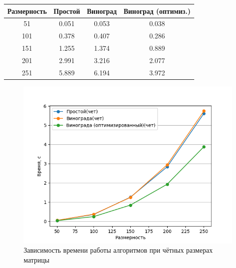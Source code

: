 \begin{table}[!ht]
	\begin{center}
		\begin{tabular}{|c|c|c|c|} 
			\hline
			Размерность & Простой & Виноград & Виноград (оптимиз.) \\  
			\hline
			51 & 0.051 & 0.053 & 0.038 \\
			\hline
			101 & 0.378 & 0.407 & 0.286 \\
			\hline
			151 & 1.255 & 1.374 & 0.889 \\
			\hline
			201 & 2.991 & 3.216 & 2.077 \\
			\hline
			251 & 5.889 & 6.194 & 3.972 \\
			\hline
		\end{tabular}
		\label{tab:profilingalgs2}
	\end{center}
\end{table}


\begin{figure}[!h]
	\centering
	\includegraphics[scale=0.6]{imgs/1.png}
	\caption{Зависимость времени работы алгоритмов при чётных размерах матрицы}
	\label{img:profiling1}
\end{figure}

